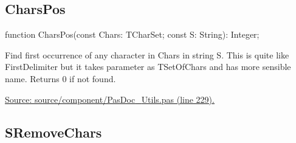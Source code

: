 \documentclass{report}
\newif\ifpdf
\begin{document}
\subsection*{CharsPos}
\fi
\label{PasDoc_Utils-CharsPos}
\begin{list}{}{
\setlength{\itemindent}{0cm}
\setlength{\listparindent}{0cm}
\setlength{\leftmargin}{\evensidemargin}
\addtolength{\leftmargin}{\tmplength}
\settowidth{\labelsep}{X}
\addtolength{\leftmargin}{\labelsep}
\setlength{\labelwidth}{\tmplength}
}
\item[\textbf{Declaration}\hfill]
\ifpdf
\begin{flushleft}
\fi
\begin{ttfamily}
function CharsPos(const Chars: TCharSet; const S: String): Integer;\end{ttfamily}

\ifpdf
\end{flushleft}
\fi

\par
\item[\textbf{Description}]
Find first occurrence of any character in Chars in string S. This is quite like FirstDelimiter but it takes parameter as TSetOfChars and has more sensible name. Returns 0 if not found.\par
\href{https://github.com/pasdoc/pasdoc/blob/master/source/component/PasDoc_Utils.pas#L229}{Source: source/component/PasDoc{\_}Utils.pas (line 229).}

\end{list}
\ifpdf
\subsection*{\large{\textbf{SRemoveChars}}\normalsize\hspace{1ex}\hrulefill}
\else
\end{document}

